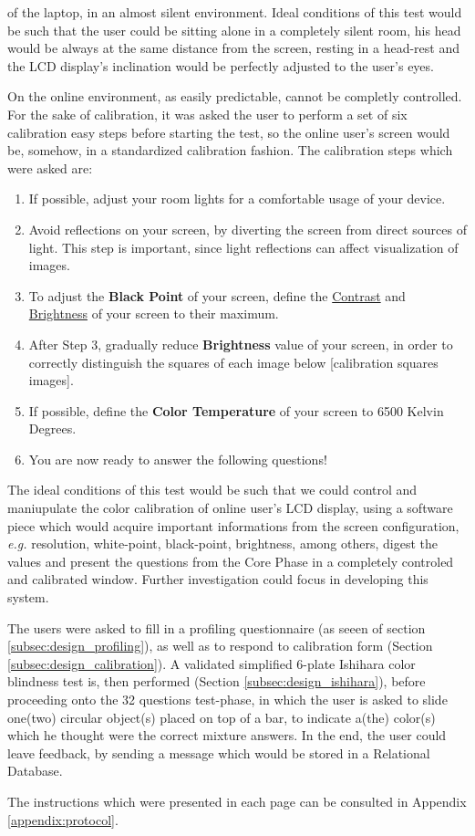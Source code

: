 of the laptop, in an almost silent environment. Ideal conditions of this test would be such that the user could be sitting alone in a completely
silent room, his head would be always at the same distance from the screen, resting in a head-rest and the LCD display's inclination would be perfectly
adjusted to the user's eyes. \par
%
On the online environment, as easily predictable, cannot be completly controlled. For the sake of calibration, it was asked the user
to perform a set of six calibration easy steps before starting the test, so the online user's screen would be,
somehow, in a standardized calibration fashion. The calibration steps which were asked are:
%
\begin{enumerate}
  \item If possible, adjust your room lights for a comfortable usage of your device.
  \item Avoid reflections on your screen, by diverting the screen from direct sources of light. This step is important,
  since light reflections can affect visualization of images.
  \item To adjust the \textbf{Black Point} of your screen, define the \ul{Contrast} and \ul{Brightness} of your screen to their maximum.
  \item After Step 3, gradually reduce \textbf{Brightness} value of your screen, in order to correctly distinguish the squares of each image below [calibration squares images].
  \item If possible, define the \textbf{Color Temperature} of your screen to 6500 Kelvin Degrees.
  \item You are now ready to answer the following questions!
\end{enumerate} \par
%
The ideal conditions of this test would be such that we could control and maniupulate the color calibration of online user's LCD display, using a software
piece which would acquire important informations from the screen configuration, \emph{e.g.} resolution, white-point, black-point, brightness, among others,
digest the values and present the questions from the Core Phase in a completely controled and calibrated window. Further investigation could focus in
developing this system. \par
%
The users were asked to fill in a profiling questionnaire (as seeen of section \ref{subsec:design_profiling}), as well as to respond to calibration form
(Section \ref{subsec:design_calibration}). A validated simplified 6-plate Ishihara color blindness test \cite{Alwis1992} is, then performed
(Section \ref{subsec:design_ishihara}), before proceeding onto the 32 questions test-phase, in which the user is asked to slide one(two) circular
object(s) placed on top of a bar, to indicate a(the) color(s) which he thought were the correct mixture answers. In the end, the user could leave
feedback, by sending a message which would be stored in a Relational Database. \par
%
The instructions which were presented in each page can be consulted in Appendix \ref{appendix:protocol}. \par
%
